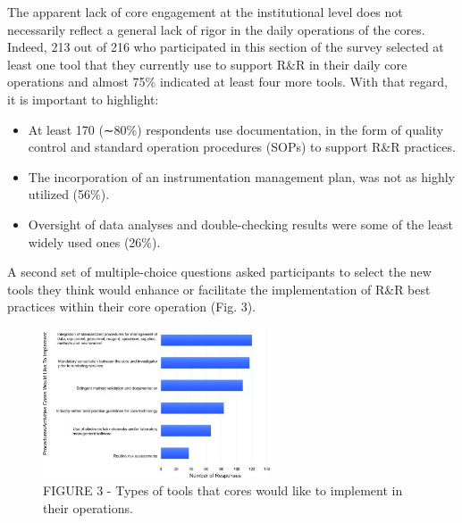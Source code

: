 \documentclass[]{article}
\providecommand{\tightlist}{%
  \setlength{\itemsep}{0pt}\setlength{\parskip}{0pt}}
\begin{document}
The apparent lack of core engagement at the institutional level does not
necessarily reflect a general lack of rigor in the daily operations of
the cores. Indeed, 213 out of 216 who participated in this section of
the survey selected at least one tool that they currently use to support
R\&R in their daily core operations and almost 75\% indicated at least
four more tools. With that regard, it is important to highlight:

\begin{itemize}
\tightlist
\item
  At least 170 (∼80\%) respondents use documentation, in the form of
  quality control and standard operation procedures (SOPs) to support
  R\&R practices.
\item
  The incorporation of an instrumentation management plan, was not as
  highly utilized (56\%).
\item
  Oversight of data analyses and double-checking results were some of
  the least widely used ones (26\%).
\end{itemize}

A second set of multiple-choice questions asked participants to select
the new tools they think would enhance or facilitate the implementation
of R\&R best practices within their core operation (Fig. 3).

\begin{figure}
\centering
\includegraphics[width=0.60000\textwidth,height=0.80000\textwidth]{../figs/fig3_paper.jpg}
\caption{FIGURE 3 - Types of tools that cores would like to implement in
their operations.}
\end{figure}
\end{document}
